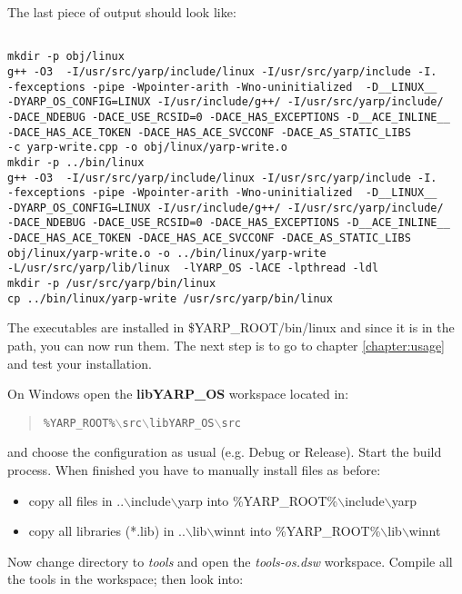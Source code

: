 The last piece of output should look like:
\begin{verbatim}

mkdir -p obj/linux
g++ -O3  -I/usr/src/yarp/include/linux -I/usr/src/yarp/include -I.  
-fexceptions -pipe -Wpointer-arith -Wno-uninitialized  -D__LINUX__ 
-DYARP_OS_CONFIG=LINUX -I/usr/include/g++/ -I/usr/src/yarp/include/ 
-DACE_NDEBUG -DACE_USE_RCSID=0 -DACE_HAS_EXCEPTIONS -D__ACE_INLINE__ 
-DACE_HAS_ACE_TOKEN -DACE_HAS_ACE_SVCCONF -DACE_AS_STATIC_LIBS   
-c yarp-write.cpp -o obj/linux/yarp-write.o
mkdir -p ../bin/linux
g++ -O3  -I/usr/src/yarp/include/linux -I/usr/src/yarp/include -I.  
-fexceptions -pipe -Wpointer-arith -Wno-uninitialized  -D__LINUX__ 
-DYARP_OS_CONFIG=LINUX -I/usr/include/g++/ -I/usr/src/yarp/include/ 
-DACE_NDEBUG -DACE_USE_RCSID=0 -DACE_HAS_EXCEPTIONS -D__ACE_INLINE__ 
-DACE_HAS_ACE_TOKEN -DACE_HAS_ACE_SVCCONF -DACE_AS_STATIC_LIBS   
obj/linux/yarp-write.o -o ../bin/linux/yarp-write 
-L/usr/src/yarp/lib/linux  -lYARP_OS -lACE -lpthread -ldl
mkdir -p /usr/src/yarp/bin/linux
cp ../bin/linux/yarp-write /usr/src/yarp/bin/linux

\end{verbatim}

The executables are installed in \$YARP\_ROOT/bin/linux and since it is in the path, you can now run them. The next step is to go to chapter \ref{chapter:usage} and test your installation. 


On Windows open the {\bf libYARP\_OS} workspace located in:

\begin{quote}
{\tt \%YARP\_ROOT\%$\backslash$src$\backslash$libYARP\_OS$\backslash$src}
\end{quote}

\noindent and choose the configuration as usual (e.g. Debug or Release). Start the build process. When finished you have to manually install files as before:

\begin{itemize}
\item copy all files in ..$\backslash$include$\backslash$yarp into \%YARP\_ROOT\%$\backslash$include$\backslash$yarp
\item copy all libraries (*.lib) in ..$\backslash$lib$\backslash$winnt into
\%YARP\_ROOT\%$\backslash$lib$\backslash$winnt
\end{itemize}

Now change directory to {\em tools} and open the {\em tools-os.dsw} workspace. Compile all the tools in the workspace; then look into:

